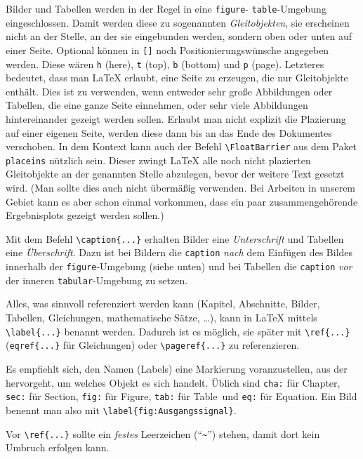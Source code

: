 Bilder und Tabellen werden in der Regel in eine \verb|figure|- \bzw \verb|table|-Umgebung eingeschlossen.
Damit werden diese zu sogenannten \emph{Gleitobjekten}, \dah sie erscheinen nicht an der Stelle, an der sie eingebunden werden, sondern oben oder unten auf einer Seite.
Optional können in \verb|[]| noch Positionierungswünsche angegeben werden.
Diese wären \verb|h| (here), \verb|t| (top), \verb|b| (bottom) und \verb|p| (page).
Letzteres bedeutet, dass man \LaTeX{} erlaubt, eine Seite zu erzeugen, die nur Gleitobjekte enthält.
Dies ist zu verwenden, wenn entweder sehr große Abbildungen oder Tabellen, die eine ganze Seite einnehmen, oder sehr viele Abbildungen hintereinander gezeigt werden sollen.
Erlaubt man nicht explizit die Plazierung auf einer eigenen Seite, werden diese dann bis an das Ende des Dokumentes verschoben.
In dem Kontext kann auch der Befehl \verb|\FloatBarrier| aus dem Paket \verb|placeins| nützlich sein.
Dieser zwingt \LaTeX{} alle noch nicht plazierten Gleitobjekte an der genannten Stelle abzulegen, bevor der weitere Text gesetzt wird.
(Man sollte dies auch nicht übermäßig verwenden. Bei Arbeiten in unserem Gebiet kann es aber schon einmal vorkommen, dass ein paar zusammengehörende Ergebnisplots gezeigt werden sollen.)

Mit dem Befehl \verb|\caption{...}| erhalten Bilder eine \emph{Unterschrift} und Tabellen eine \emph{Überschrift}.
Dazu ist bei Bildern die \verb|caption| \emph{nach} dem Einfügen des Bildes innerhalb der \texttt{figure}-Umgebung (siehe unten) und bei Tabellen die \verb|caption| \emph{vor} der inneren \verb|tabular|-Umgebung zu setzen.

Alles, was sinnvoll referenziert werden kann (Kapitel, Abschnitte, Bilder, Tabellen, Gleichungen, mathematische Sätze, \ldots), kann in \LaTeX{} mittels \verb|\label{...}| benannt werden.
Dadurch ist es möglich, sie später mit \verb|\ref{...}| (\bzw \verb|eqref{...}| für Gleichungen) oder \verb|\pageref{...}| zu referenzieren.

Es empfiehlt sich, den Namen (Labels) eine Markierung voranzustellen, aus der hervorgeht, um welches Objekt es sich handelt.
Üblich sind \verb|cha:| für \glqq Chapter\grqq, \verb|sec:| für \glqq Section\grqq, \verb|fig:| für \glqq Figure\grqq, \verb|tab:| für \glqq Table\grqq\ und \verb|eq:| für \glqq Equation\grqq.
Ein Bild benennt man also \zB mit \verb|\label{fig:Ausgangssignal}|.

Vor \verb|\ref{...}| sollte ein \emph{festes} Leerzeichen ("`\verb|~|"') stehen, damit dort kein Umbruch erfolgen kann.




